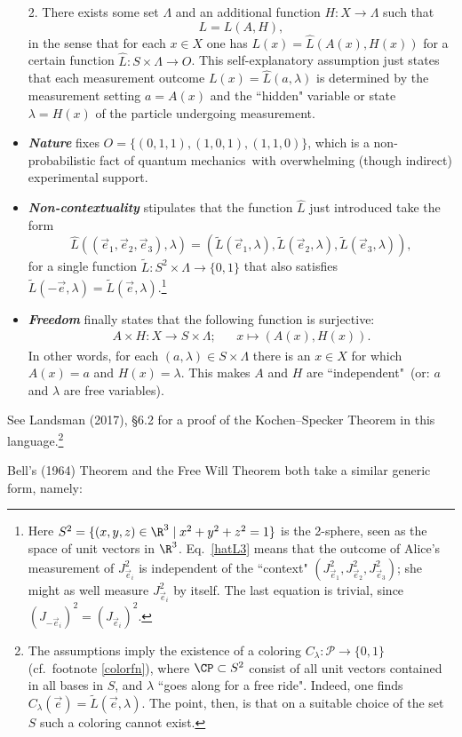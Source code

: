 \documentclass[12pt]{article}
\numberwithin{equation}{section}
\newcommand{\hi}[1]{\emph{\textbf{#1}}}
\newcommand{\qm}{quantum mechanics}
\newcommand{\er}{\eqref}
\newcommand{\beq}{\begin{equation}}
\newcommand{\eeq}{\end{equation}}
\newcommand{\til}{\tilde}
\newcommand{\raw}{\rightarrow}
\newcommand{\x}{\times}
\newcommand{\lm}{\lambda} \newcommand{\Lm}{\Lambda}
\begin{document}
\begin{itemize}
2. There exists some set $\Lm$ and an additional function 
$H:X\raw \Lm$ such that  
\beq
L=L(A,H),
\eeq
 in the sense that
 for each $x\in X$ one has $L(x)=\hat{L}(A(x),H(x))$
  for a certain function  $\hat{L}:S \x \Lm\raw O$.  This self-explanatory assumption just states that each measurement outcome 
  $L(x)=\hat{L}(a,\lm)$ 
  is determined by the  measurement setting $a=A(x)$ and the ``hidden" variable or state $\lm=H(x)$  of the particle
 undergoing measurement.
  \item  \hi{Nature}  fixes 
 $O=\{(0,1,1), (1,0,1), (1,1,0)\}$, which is a non-probabilistic fact of \qm\ with overwhelming (though  indirect) experimental support. 
   \item \hi{Non-contextuality}
stipulates that the function $\hat{L}$ just introduced take the form
  \beq
  \hat{L}((\vec{e}_1,\vec{e}_2,\vec{e}_3),\lm)=(\til{L}(\vec{e}_1,\lm), \til{L}(\vec{e}_2,\lm), \til{L}(\vec{e}_3,\lm)), \label{hatL3}
  \eeq
  for a single function $\til{L}:S^2\x \Lm\raw\{0,1\}$ that also satisfies 
$\til{L}(-\vec{e},\lm)=\til{L}(\vec{e},\lm)$.\footnote{Here $S^2=\{(x,y,z)\in\R^3\mid x^2+y^2+z^2=1\}$ is the 2-sphere, seen as the space of unit vectors in $\R^3$.
Eq.\ \er{hatL3} means that the outcome of Alice's measurement 
of $J_{\vec{e}_i}^2$ is independent of the ``context" $(J_{\vec{e}_1}^2, J_{\vec{e}_2}^2, J_{\vec{e}_3}^2)$; she might as well measure $J_{\vec{e}_i}^2$ by itself. The last equation is trivial, since $(J_{-\vec{e}_i})^2=(J_{\vec{e}_i})^2$.
}
  \item \hi{Freedom} finally states that the following function is surjective:
\begin{align}
A\x H:X\raw S\x \Lm; && x\mapsto (A(x),H(x)).
\end{align}
 In other words, 
 for each $(a,\lm)\in S\x\Lm$ there is an $x\in X$  for which $A(x)=a$ and $H(x)=\lm$. This makes   $A$ and $H$ are ``independent"\
 (or: $a$ and $\lm$ are free variables).
  \end{itemize}
See Landsman (2017), \S6.2 for a proof of the Kochen--Specker Theorem in this language.\footnote{
The assumptions imply the existence of a coloring $C_{\lm}: \mathcal{P}\raw\{0,1\}$ (cf.\ footnote \ref{colorfn}), where 
$\CP\subset S^2$ consist of all unit vectors contained in all bases in $S$, and $\lm$ ``goes along for a free ride". Indeed, one finds
$C_{\lm}(\vec{e})=\til{L}(\vec{e},\lm)$. The point, then, is that on a suitable choice of the set $S$ such a coloring cannot exist. 
}


Bell's (1964) Theorem and the Free Will Theorem both take a similar generic form, namely:
\end{document}
